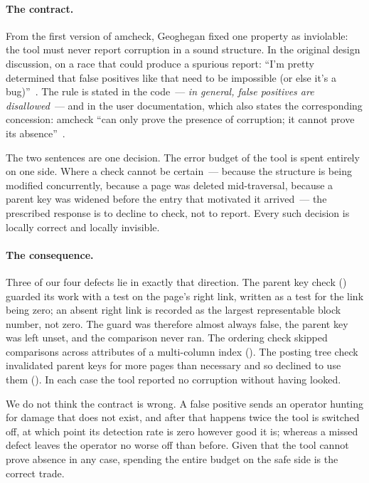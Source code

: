 \paragraph{The contract.} From the first version of amcheck, Geoghegan fixed one
property as inviolable: the tool must never report corruption in a sound
structure. In the original design discussion, on a race that could produce a
spurious report: ``I'm pretty determined that false positives like that need to
be impossible (or else it's a bug)''~\cite{thread-amcheck-btree}. The rule is
stated in the code~--- \emph{in general, false positives are disallowed}~--- and
in the user documentation, which also states the corresponding concession:
amcheck ``can only prove the presence of corruption; it cannot prove its
absence''~\cite{pgdocs}.

The two sentences are one decision. The error budget of the tool is spent
entirely on one side. Where a check cannot be certain~--- because the structure
is being modified concurrently, because a page was deleted mid-traversal, because
a parent key was widened before the entry that motivated it arrived~--- the
prescribed response is to decline to check, not to report. Every such decision is
locally correct and locally invisible.

\paragraph{The consequence.} Three of our four defects lie in exactly that
direction. The parent key check () guarded its work with a test
on the page's right link, written as a test for the link being zero; an absent
right link is recorded as the largest representable block number, not zero. The
guard was therefore almost always false, the parent key was left unset, and the
comparison never ran. The ordering check skipped comparisons across attributes of
a multi-column index (). The posting tree check invalidated
parent keys for more pages than necessary and so declined to use them
(). In each case the tool reported no corruption without having
looked.

We do not think the contract is wrong. A false positive sends an operator hunting
for damage that does not exist, and after that happens twice the tool is switched
off, at which point its detection rate is zero however good it is; whereas a
missed defect leaves the operator no worse off than before. Given that the tool
cannot prove absence in any case, spending the entire budget on the safe side is
the correct trade.

